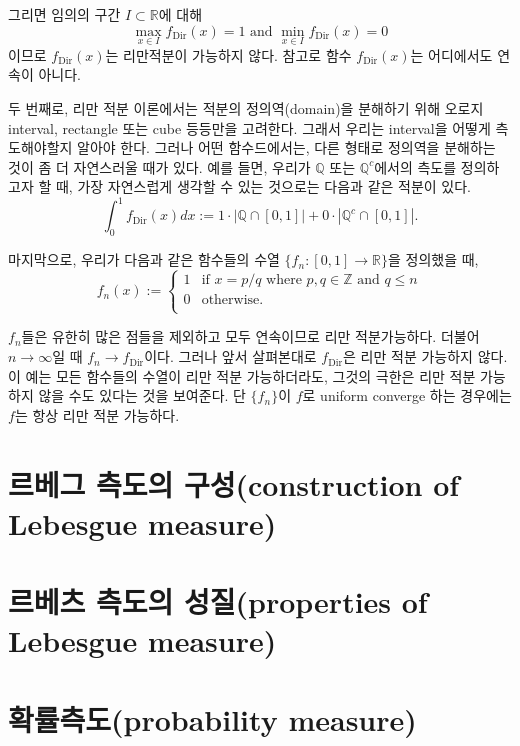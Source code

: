\documentclass[b5paper,]{scrbook}
\theoremstyle{plain}
\theoremstyle{definition}
\numberwithin{equation}{section}
\begin{document}
그리면 임의의 구간 \(I\subset\mathbb{R}\)에 대해
\[\max_{x\in I}f_{\text{Dir}}(x) =1 \text{ and } \min_{x\in I}f_{\text{Dir}}(x) =0\]
이므로 \(f_{\text{Dir}}(x)\)는 리만적분이 가능하지 않다. 참고로 함수
\(f_{\text{Dir}}(x)\)는 어디에서도 연속이 아니다.

두 번째로, 리만 적분 이론에서는 적분의 정의역(domain)을 분해하기 위해
오로지 interval, rectangle 또는 cube 등등만을 고려한다. 그래서 우리는
interval을 어떻게 측도해야할지 알아야 한다. 그러나 어떤 함수드에서는,
다른 형태로 정의역을 분해하는 것이 좀 더 자연스러울 때가 있다. 예를
들면, 우리가 \(\mathbb{Q}\) 또는 \(\mathbb{Q}^{c}\)에서의 측도를
정의하고자 할 때, 가장 자연스럽게 생각할 수 있는 것으로는 다음과 같은
적분이 있다.
\[\int_{0}^{1}f_{\text{Dir}}(x)dx:=1\cdot |\mathbb{Q}\cap [0,1]| + 0\cdot |\mathbb{Q}^{c}\cap [0,1]|.\]

마지막으로, 우리가 다음과 같은 함수들의 수열
\(\{f_{n}:[0,1]\rightarrow\mathbb{R} \}\)을 정의했을 때, \[
f_{n}(x) := 
\begin{cases}
1 & \text{if $x=p/q$ where $p,q\in\mathbb{Z}$ and $q\leq n$} \\
0 & \text{otherwise.}\\
\end{cases}
\]

\(f_{n}\)들은 유한히 많은 점들을 제외하고 모두 연속이므로 리만
적분가능하다. 더불어 \(n\rightarrow \infty\)일 때
\(f_{n}\rightarrow f_{\text{Dir}}\)이다. 그러나 앞서 살펴본대로
\(f_{\text{Dir}}\)은 리만 적분 가능하지 않다. 이 예는 모든 함수들의
수열이 리만 적분 가능하더라도, 그것의 극한은 리만 적분 가능하지 않을
수도 있다는 것을 보여준다. 단 \(\{f_{n}\}\)이 \(f\)로 uniform converge
하는 경우에는 \(f\)는 항상 리만 적분 가능하다.

\section{르베그 측도의 구성(construction of Lebesgue
measure)}\label{--construction-of-lebesgue-measure}

\section{르베츠 측도의 성질(properties of Lebesgue
measure)}\label{--properties-of-lebesgue-measure}

\section{확률측도(probability measure)}\label{probability-measure}
\end{document}
